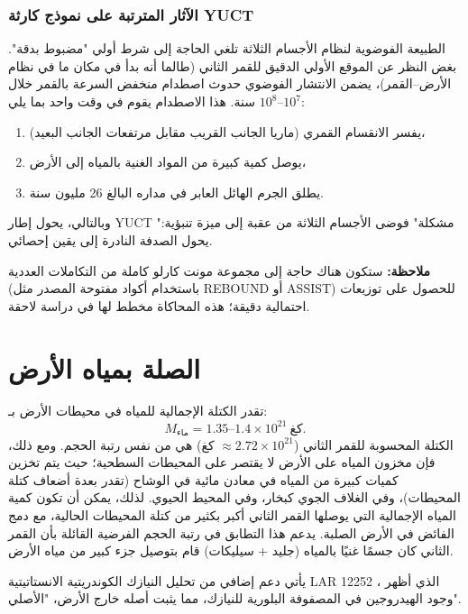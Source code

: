 \documentclass[11pt,a4paper]{article}
\begin{document}
	\subsubsection{الآثار المترتبة على نموذج كارثة YUCT}
	
	الطبيعة الفوضوية لنظام الأجسام الثلاثة تلغي الحاجة إلى شرط أولي "مضبوط بدقة". بغض النظر عن الموقع الأولي الدقيق للقمر الثاني (طالما أنه بدأ في مكان ما في نظام الأرض–القمر)، يضمن الانتشار الفوضوي حدوث اصطدام منخفض السرعة بالقمر خلال \(10^{7}\)–\(10^{8}\) سنة. هذا الاصطدام يقوم في وقت واحد بما يلي:
	
	\begin{enumerate}
		\item يفسر الانقسام القمري (ماريا الجانب القريب مقابل مرتفعات الجانب البعيد)،
		\item يوصل كمية كبيرة من المواد الغنية بالمياه إلى الأرض،
		\item يطلق الجرم الهائل العابر في مداره البالغ 26 مليون سنة.
	\end{enumerate}
	
	وبالتالي، يحول إطار YUCT "مشكلة" فوضى الأجسام الثلاثة من عقبة إلى ميزة تنبؤية: يحول الصدفة النادرة إلى يقين إحصائي.
	
	\vspace{0.2cm}
	\noindent
	\textbf{ملاحظة:} ستكون هناك حاجة إلى مجموعة مونت كارلو كاملة من التكاملات العددية (باستخدام أكواد مفتوحة المصدر مثل REBOUND أو ASSIST) للحصول على توزيعات احتمالية دقيقة؛ هذه المحاكاة مخطط لها في دراسة لاحقة.
	
	
	\section{الصلة بمياه الأرض}
	
	تقدر الكتلة الإجمالية للمياه في محيطات الأرض بـ:
	\[
	M_{\text{ماء}} = 1.35\text{–}1.4 \times 10^{21}\ \text{كغ}.
	\]
	الكتلة المحسوبة للقمر الثاني (\(\approx 2.72 \times 10^{21}\) كغ) هي من نفس رتبة الحجم. ومع ذلك، فإن مخزون المياه على الأرض لا يقتصر على المحيطات السطحية؛ حيث يتم تخزين كميات كبيرة من المياه في معادن مائية في الوشاح (تقدر بعدة أضعاف كتلة المحيطات)، وفي الغلاف الجوي كبخار، وفي المحيط الحيوي. لذلك، يمكن أن تكون كمية المياه الإجمالية التي يوصلها القمر الثاني أكبر بكثير من كتلة المحيطات الحالية، مع دمج الفائض في الأرض الصلبة. يدعم هذا التطابق في رتبة الحجم الفرضية القائلة بأن القمر الثاني كان جسمًا غنيًا بالمياه (جليد + سيليكات) قام بتوصيل جزء كبير من مياه الأرض.
	
	يأتي دعم إضافي من تحليل النيازك الكوندريتية الانستاتيتية LAR 12252 \cite{Gardiner2025}، الذي أظهر وجود الهيدروجين في المصفوفة البلورية للنيازك، مما يثبت أصله خارج الأرض، "الأصلي".
	
\end{document}

